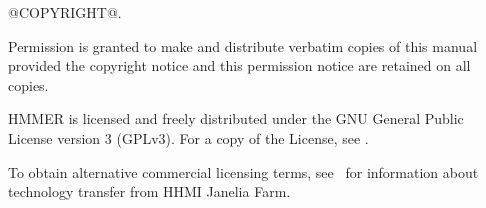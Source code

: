 \vspace*{\fill}
\begin{flushleft}
@COPYRIGHT@.\vspace{5mm}

\vspace{5mm}
Permission is granted to make and distribute verbatim copies of this
manual provided the copyright notice and this permission notice are
retained on all copies.\vspace{5mm}

\vspace{5mm} HMMER is licensed and freely distributed under the GNU
General Public License version 3 (GPLv3). For a copy of the License,
see .

\vspace{5mm}

To obtain alternative commercial licensing terms, see
\ for
information about technology transfer from HHMI Janelia Farm.

\vspace{5mm}
\end{flushleft}



